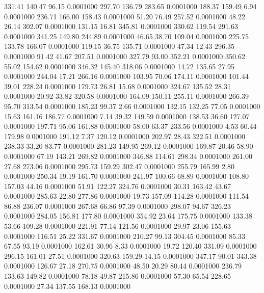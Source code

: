  331.41  140.47   96.15   0.0001000
 297.70  136.79  283.65   0.0001000
 188.37  159.49    6.94   0.0001000
 236.71  166.00  158.43   0.0001000
  51.20   76.49  257.52   0.0001000
  48.22   26.14  302.07   0.0001000
 131.15   16.81  345.81   0.0001000
 330.62  119.54  291.63   0.0001000
 341.25  149.80  244.89   0.0001000
  46.65   38.70  109.04   0.0001000
 225.75  133.78  166.07   0.0001000
 119.15   36.75  135.71   0.0001000
  47.34   12.43  296.35   0.0001000
  91.42   41.67  207.51   0.0001000
 327.79   93.00  352.21   0.0001000
 350.62   55.02  154.62   0.0001000
 346.32  145.40  318.06   0.0001000
  14.72  135.65   27.95   0.0001000
 244.04   17.21  266.16   0.0001000
 103.95   70.06  174.11   0.0001000
 101.44   39.01  228.24   0.0001000
 179.73   26.81   15.68   0.0001000
 324.67  135.52   28.31   0.0001000
  20.92   33.82  320.58   0.0001000
 164.09  150.11  255.11   0.0001000
 266.39   95.70  313.54   0.0001000
 185.23   99.37    2.66   0.0001000
 132.15  132.25   77.05   0.0001000
  15.63  161.16  186.77   0.0001000
   7.14   39.32  149.59   0.0001000
 138.53   36.60  127.07   0.0001000
 197.71   95.06  161.88   0.0001000
  58.00   63.37  233.56   0.0001000
   4.53   60.44  179.98   0.0001000
 191.12    7.37  120.12   0.0001000
 202.97   28.43  322.51   0.0001000
 238.33   33.20   83.77   0.0001000
 281.23  149.95  269.12   0.0001000
 169.87   20.46   58.90   0.0001000
  67.19  143.21  269.82   0.0001000
 346.88  114.61  298.34   0.0001000
 261.00   27.68  273.06   0.0001000
 295.73  159.29  302.47   0.0001000
 255.79  165.99    2.80   0.0001000
 250.34   19.19  161.70   0.0001000
 241.97  100.66   68.89   0.0001000
 108.80  157.03   44.16   0.0001000
  51.91  122.27  324.76   0.0001000
  30.31  163.42   43.67   0.0001000
 285.63   22.80  277.86   0.0001000
  19.73  157.09  114.28   0.0001000
 111.54   86.88  236.07   0.0001000
 267.68   66.86   97.39   0.0001000
 298.07   94.67  326.23   0.0001000
 284.05  156.81  177.80   0.0001000
 354.92   23.64  175.75   0.0001000
 133.38   53.66  109.28   0.0001000
 221.91   77.14  121.56   0.0001000
  29.97   23.06  155.63   0.0001000
 116.51   25.22  331.67   0.0001000
 210.27   99.13  304.45   0.0001000
  85.33   67.55   93.19   0.0001000
 162.61   30.96    8.33   0.0001000
  19.72  120.40  331.09   0.0001000
 296.15  161.01   27.51   0.0001000
 320.63  159.29   14.15   0.0001000
 347.17   90.01  343.38   0.0001000
 126.67   27.18  270.75   0.0001000
  48.50   20.29   80.44   0.0001000
 236.79  133.63  149.82   0.0001000
  78.18   49.87  215.86   0.0001000
  57.30   65.54  228.65   0.0001000
  27.34  137.55  168.13   0.0001000
